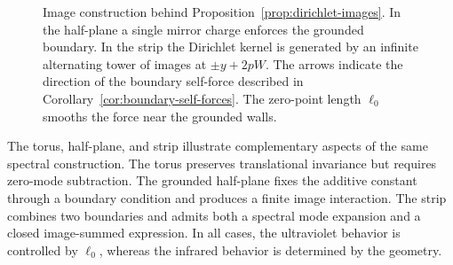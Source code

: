 \documentclass[nopacs,amsmath,amsfonts,amssymb,aps,superscriptaddress]{revtex4}
\begin{document}
\begin{figure}[t]
\centering
{}
\caption{Image construction behind Proposition~\ref{prop:dirichlet-images}. In the half-plane a single mirror charge enforces the grounded boundary. In the strip the Dirichlet kernel is generated by an infinite alternating tower of images at \(\pm y+2pW\). The arrows indicate the direction of the boundary self-force described in Corollary~\ref{cor:boundary-self-forces}. The zero-point length \(\ell_0\) smooths the force near the grounded walls.}
\label{fig:dirichlet-images}
\end{figure}
The torus, half-plane, and strip illustrate complementary aspects of the same spectral construction. The torus preserves translational invariance but requires zero-mode subtraction. The grounded half-plane fixes the additive constant through a boundary condition and produces a finite image interaction. The strip combines two boundaries and admits both a spectral mode expansion and a closed image-summed expression. In all cases, the ultraviolet behavior is controlled by \(\ell_0\), whereas the infrared behavior is determined by the geometry.
\end{document}
